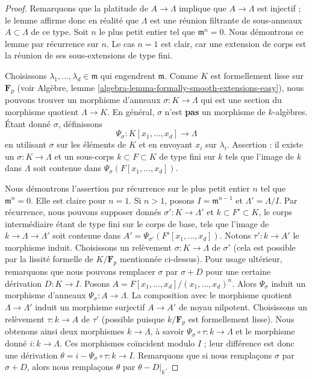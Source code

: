 \begin{proof}
Remarquons que la platitude de $A \to \Lambda$ implique que $A \to \Lambda$
est injectif ; le lemme affirme donc en réalité que $\Lambda$ est une
réunion filtrante de sous-anneaux $A \subset \Lambda$ de ce type.
Soit $n$ le plus petit entier tel que $\mathfrak m^n = 0$.
Nous démontrons ce lemme par récurrence sur $n$. Le cas $n = 1$ est clair,
car une extension de corps est la réunion de ses sous-extensions de type fini.

\medskip\noindent
Choisissons $\lambda_1, \ldots, \lambda_d \in \mathfrak m$ qui engendrent
$\mathfrak m$. Comme $K$ est formellement lisse sur $\mathbf{F}_p$ (voir
Algèbre, lemme \ref{algebra-lemma-formally-smooth-extensions-easy}), nous pouvons
trouver un morphisme d'anneaux $\sigma : K \to \Lambda$ qui est une section du
morphisme quotient $\Lambda \to K$. En général, $\sigma$ n'est {\bf pas}
un morphisme de $k$-algèbres. Étant donné $\sigma$, définissons
$$
\Psi_\sigma : K[x_1, \ldots, x_d] \longrightarrow \Lambda
$$
en utilisant $\sigma$ sur les éléments de $K$ et en envoyant $x_i$ sur $\lambda_i$.
Assertion : il existe un $\sigma : K \to \Lambda$
et un sous-corps $k \subset F \subset K$ de type fini sur $k$
tels que l'image de $k$ dans $\Lambda$ soit contenue dans
$\Psi_\sigma(F[x_1, \ldots, x_d])$.

\medskip\noindent
Nous démontrons l'assertion par récurrence sur le plus petit entier $n$ tel que
$\mathfrak m^n = 0$. Elle est claire pour $n = 1$. Si $n > 1$, posons
$I = \mathfrak m^{n - 1}$ et $\Lambda' = \Lambda/I$.
Par récurrence, nous pouvons supposer donnés
$\sigma' : K \to \Lambda'$ et $k \subset F' \subset K$, le corps intermédiaire
étant de type fini sur le corps de base, tels que l'image de $k \to \Lambda \to \Lambda'$
soit contenue dans $A' = \Psi_{\sigma'}(F'[x_1, \ldots, x_d])$.
Notons $\tau' : k \to A'$ le morphisme induit.
Choisissons un relèvement $\sigma : K \to \Lambda$ de $\sigma'$ (cela est possible
par la lissité formelle de $K/\mathbf{F}_p$ mentionnée ci-dessus).
Pour usage ultérieur, remarquons que nous pouvons remplacer $\sigma$ par
$\sigma + D$ pour une certaine dérivation $D : K \to I$.
Posons $A = F[x_1, \ldots, x_d]/(x_1, \ldots, x_d)^n$.
Alors $\Psi_\sigma$ induit un morphisme d'anneaux
$\Psi_\sigma : A \to \Lambda$. La composition avec le
morphisme quotient $\Lambda \to \Lambda'$ induit un morphisme surjectif
$A \to A'$ de noyau nilpotent.
Choisissons un relèvement $\tau : k \to A$ de $\tau'$ (possible puisque $k/\mathbf{F}_p$
est formellement lisse). Nous obtenons ainsi deux morphismes $k \to \Lambda$, à savoir
$\Psi_\sigma \circ \tau : k \to \Lambda$ et le morphisme donné $i : k \to \Lambda$.
Ces morphismes coïncident modulo $I$ ; leur différence est donc une
dérivation $\theta = i - \Psi_\sigma \circ \tau : k \to I$.
Remarquons que si nous remplaçons $\sigma$ par $\sigma + D$, alors nous remplaçons
$\theta$ par $\theta - D|_k$.


\end{proof}

